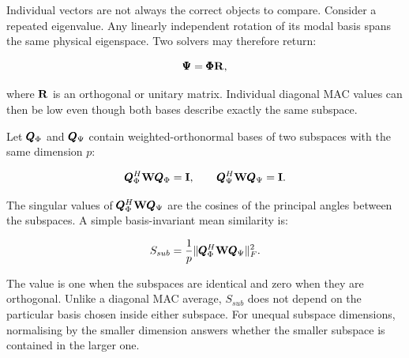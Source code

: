 Individual vectors are not always the correct objects to compare. Consider a
repeated eigenvalue. Any linearly independent rotation of its modal basis spans
the same physical eigenspace. Two solvers may therefore return:

\begin{equation}
    \pmb{\Psi}=\pmb{\Phi}\mathbf{R},
\end{equation}

where $\mathbf{R}$ is an orthogonal or unitary matrix. Individual diagonal MAC values
can then be low even though both bases describe exactly the same subspace.

Let $\pmb{Q}_{\Phi}$ and $\pmb{Q}_{\Psi}$ contain weighted-orthonormal bases of two
subspaces with the same dimension $p$:

\begin{equation}
    \pmb{Q}_{\Phi}^{H}\mathbf{W}\pmb{Q}_{\Phi}=\mathbf{I},
    \qquad
    \pmb{Q}_{\Psi}^{H}\mathbf{W}\pmb{Q}_{\Psi}=\mathbf{I}.
\end{equation}

The singular values of
$\pmb{Q}_{\Phi}^{H}\mathbf{W}\pmb{Q}_{\Psi}$ are the cosines of the principal angles
between the subspaces. A simple basis-invariant mean similarity is:

\begin{bbox}
    \begin{equation}\label{mean-subspace-similarity}
        S_{sub}=
        \frac{1}{p}
        \| {\pmb{Q}_{\Phi}^{H}\mathbf{W}\pmb{Q}_{\Psi}} \|_{F}^{2}.
    \end{equation}
\end{bbox}

The value is one when the subspaces are identical and zero when they are
orthogonal. Unlike a diagonal MAC average, $S_{sub}$ does not depend on the
particular basis chosen inside either subspace. For unequal subspace dimensions,
normalising by the smaller dimension answers whether the smaller subspace is
contained in the larger one.

